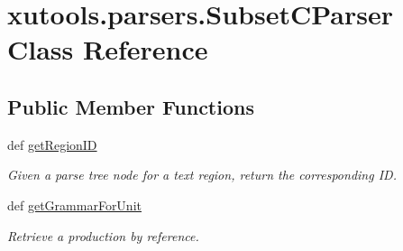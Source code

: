 \hypertarget{classxutools_1_1parsers_1_1_subset_c_parser}{\section{xutools.\-parsers.\-Subset\-C\-Parser Class Reference}
\label{classxutools_1_1parsers_1_1_subset_c_parser}
}
\subsection*{Public Member Functions}
\begin{DoxyCompactItemize}
\item 
def \hyperlink{classxutools_1_1parsers_1_1_subset_c_parser_a8988b0c0214dafa8231cf22bedfe3103}{get\-Region\-I\-D}
\begin{DoxyCompactList}\small\item\em Given a parse tree node for a text region, return the corresponding I\-D. \end{DoxyCompactList}\item 
def \hyperlink{classxutools_1_1parsers_1_1_subset_c_parser_a388d1177c97775ab9f1272145e26faeb}{get\-Grammar\-For\-Unit}
\begin{DoxyCompactList}\small\item\em Retrieve a production by reference. \end{DoxyCompactList}\end{DoxyCompactItemize}
